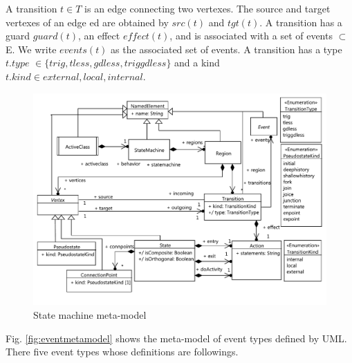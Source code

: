 
\begin{definition} A transition $t \in T$ is an edge connecting two vertexes. 
	The source and target vertexes of an edge ed are obtained by $src(t)$ and $tgt(t)$. 
	A transition has a guard $guard(t)$, an effect $effect(t)$, and is associated with a set of events $\subset$ E. We write $events(t)$ as the associated set of events. A transition has a type $t.type$ $\in \{trig, tless, gdless, triggdless\}$ and a kind $t.kind \in {external, local, internal}$.
\end{definition}

\begin{figure}
	\centering
	\includegraphics[clip, trim=0.2cm 0.8cm 0.2cm 0.2cm, width=1.0\columnwidth]{figures/smmetamodel.pdf}
	\caption{State machine meta-model} 
	\label{fig:smmetamodel}
\end{figure}

Fig. \ref{fig:eventmetamodel} shows the meta-model of event types defined by UML.
There five event types whose definitions are followings.

